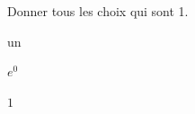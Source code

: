 \documentclass[12pt]{exam}
\begin{document}
\begin{questions}
\vspace{1em}





\question Donner tous les choix qui sont 1.



\begin{choices}

  
    \CorrectChoice un
  

  
    \CorrectChoice $e^0$
  

  
    \CorrectChoice $1$
  

\end{choices}









\vspace{1em}



\end{questions}
\end{document}
